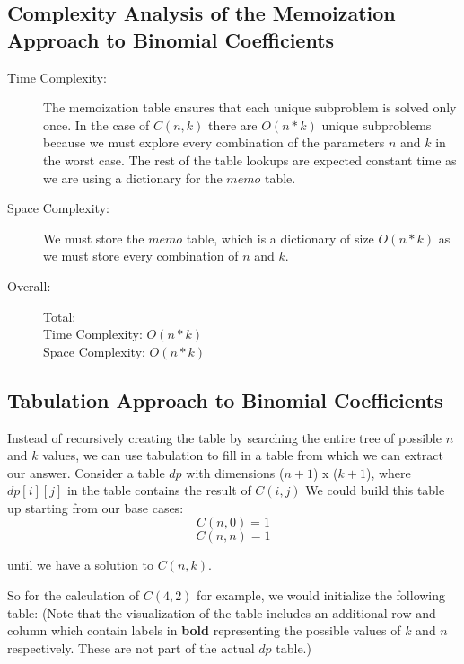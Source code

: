 \subsection{Complexity Analysis of the Memoization Approach to Binomial Coefficients}
\begin{description}
    \item[Time Complexity:]
        The memoization table ensures that each unique subproblem is solved only once.
        In the case of $C(n,k)$ there are $O(n * k)$ unique subproblems because we must explore every combination of the parameters $n$ and $k$ in the worst case.
        The rest of the table lookups are expected constant time as we are using a dictionary for the $memo$ table.

    \item[Space Complexity:] 
        We must store the $memo$ table, which is a dictionary of size $O(n * k)$ as we must store every combination of $n$ and $k$.

    \item[Overall:] Total:\\
        Time Complexity: $O(n * k)$\\
        Space Complexity: $O(n * k)$
    
\end{description}

\subsection{Tabulation Approach to Binomial Coefficients}
Instead of recursively creating the table by searching the entire tree of possible $n$ and $k$ values, we can use tabulation to fill in a table from which we can extract our answer.
Consider a table $dp$ with dimensions ($n+1$) x ($k+1$), where $dp[i][j]$ in the table contains the result of $C(i,j)$
We could build this table up starting from our base cases:
$$C(n,0) = 1$$
$$C(n,n) = 1$$

until we have a solution to $C(n,k)$.

So for the calculation of $C(4,2)$ for example, we would initialize the following table:
(Note that the visualization of the table includes an additional row and column which contain labels in \textbf{bold} representing the possible values of $k$ and $n$ respectively. These are not part of the actual $dp$ table.)

